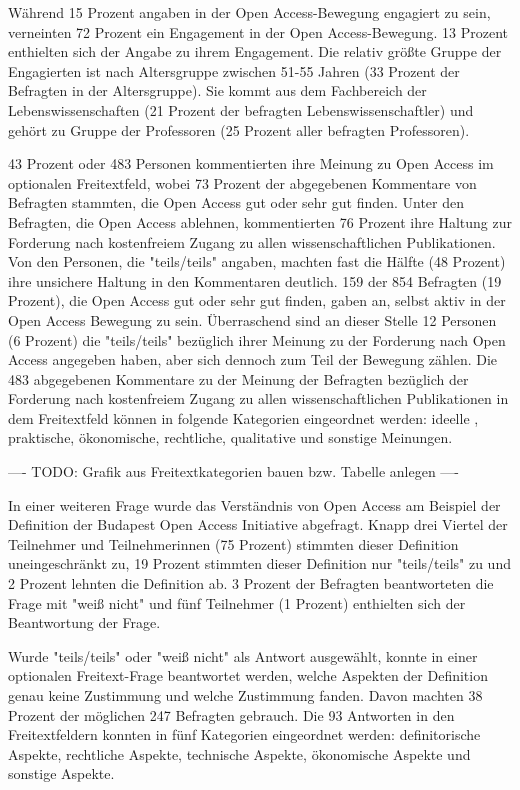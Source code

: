 Während 15 Prozent angaben in der Open Access-Bewegung engagiert zu sein, verneinten 72 Prozent ein Engagement in der Open Access-Bewegung. 13 Prozent enthielten sich der Angabe zu ihrem Engagement. Die relativ größte Gruppe der Engagierten ist nach Altersgruppe zwischen 51-55 Jahren (33 Prozent der Befragten in der Altersgruppe). Sie kommt aus dem Fachbereich der Lebenswissenschaften (21 Prozent der befragten Lebenswissenschaftler) und gehört zu Gruppe der Professoren (25 Prozent aller befragten Professoren).

43 Prozent oder 483 Personen kommentierten ihre Meinung zu Open Access im optionalen Freitextfeld, wobei 73 Prozent der abgegebenen Kommentare von Befragten stammten, die Open Access gut oder sehr gut finden. Unter den Befragten, die Open Access ablehnen, kommentierten 76 Prozent ihre Haltung zur Forderung nach kostenfreiem Zugang zu allen wissenschaftlichen Publikationen. Von den Personen, die "teils/teils" angaben, machten fast die Hälfte (48 Prozent) ihre unsichere Haltung in den Kommentaren deutlich. 159 der 854 Befragten (19 Prozent), die Open Access gut oder sehr gut finden, gaben an, selbst aktiv in der Open Access Bewegung zu sein. Überraschend sind an dieser Stelle 12 Personen (6 Prozent) die "teils/teils" bezüglich ihrer Meinung zu der Forderung nach Open Access angegeben haben, aber sich dennoch zum Teil der Bewegung zählen. Die 483 abgegebenen Kommentare zu der Meinung der Befragten bezüglich der Forderung nach kostenfreiem Zugang zu allen wissenschaftlichen Publikationen in dem Freitextfeld können in folgende Kategorien eingeordnet werden: ideelle , praktische, ökonomische, rechtliche, qualitative und sonstige Meinungen.

---- TODO: Grafik aus Freitextkategorien bauen bzw. Tabelle anlegen  ----

In einer weiteren Frage wurde das Verständnis von Open Access am Beispiel der Definition der Budapest Open Access Initiative \cite{boai_2012} abgefragt. Knapp drei Viertel der Teilnehmer und Teilnehmerinnen (75 Prozent) stimmten dieser Definition uneingeschränkt zu, 19 Prozent stimmten dieser Definition nur "teils/teils" zu und 2 Prozent lehnten die Definition ab. 3 Prozent der Befragten beantworteten die Frage mit "weiß nicht" und fünf Teilnehmer (1 Prozent) enthielten sich der Beantwortung der Frage.

Wurde "teils/teils" oder "weiß nicht" als Antwort ausgewählt, konnte in einer optionalen Freitext-Frage beantwortet werden, welche Aspekten der Definition genau keine Zustimmung und welche Zustimmung fanden. Davon machten 38 Prozent der möglichen 247 Befragten gebrauch. Die 93 Antworten in den Freitextfeldern konnten in fünf Kategorien eingeordnet werden: definitorische Aspekte, rechtliche Aspekte, technische Aspekte, ökonomische Aspekte und sonstige Aspekte.

